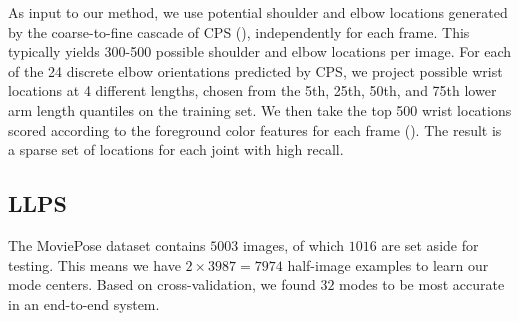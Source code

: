 As input to our method, we use potential shoulder and elbow locations generated 
by the coarse-to-fine cascade of CPS (), independently for each 
frame.  This typically yields 300-500 possible shoulder and elbow locations per 
image. For each of the 24 discrete elbow orientations predicted by CPS, we 
project possible wrist locations at 4 different lengths, chosen from the 5th, 
25th, 50th, and 75th lower arm length quantiles on the training set. We then 
take the top 500 wrist locations scored according to the foreground color 
features for each frame (). The result is a sparse set of 
locations for each joint with high recall.


\subsection{LLPS}
The MoviePose dataset contains $5003$ images, of which $1016$ are set aside for testing.  
This means we have $2\times 3987 = 7974$ half-image examples to learn our mode centers.  Based on cross-validation, we found $32$ modes to be most accurate in an end-to-end system.

